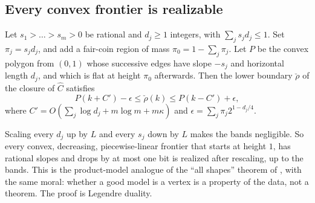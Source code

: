 \subsection{Every convex frontier is realizable}\label{app:simplicity:shapes}

\begin{corollary}\label{cor:simplicity:shapes}
Let $s_1>\dots>s_m>0$ be rational and $d_j\ge1$ integers, with $\sum_js_jd_j\le1$. Set $\pi_j=s_jd_j$, and add a fair-coin region of mass $\pi_0=1-\sum_j\pi_j$. Let $P$ be the convex polygon from $(0,1)$ whose successive edges have slope $-s_j$ and horizontal length $d_j$, and which is flat at height $\pi_0$ afterwards. Then the lower boundary $\breve\rho$ of the closure of $\hat C$ satisfies
\[
P(k+C')-\epsilon\le\breve\rho(k)\le P(k-C')+\epsilon,
\]
where $C'=O(\sum_j\log d_j+m\log m+m\kappa)$ and $\epsilon=\sum_j\pi_j2^{1-d_j/4}$.
\end{corollary}

Scaling every $d_j$ up by $L$ and every $s_j$ down by $L$ makes the bands negligible. So every convex, decreasing, piecewise-linear frontier that starts at height $1$, has rational slopes and drops by at most one bit is realized after rescaling, up to the bands. This is the product-model analogue of the ``all shapes'' theorem of \citet{vereshchagin2004kolmogorov}, with the same moral: whether a good model is a vertex is a property of the data, not a theorem. The proof is Legendre duality.

